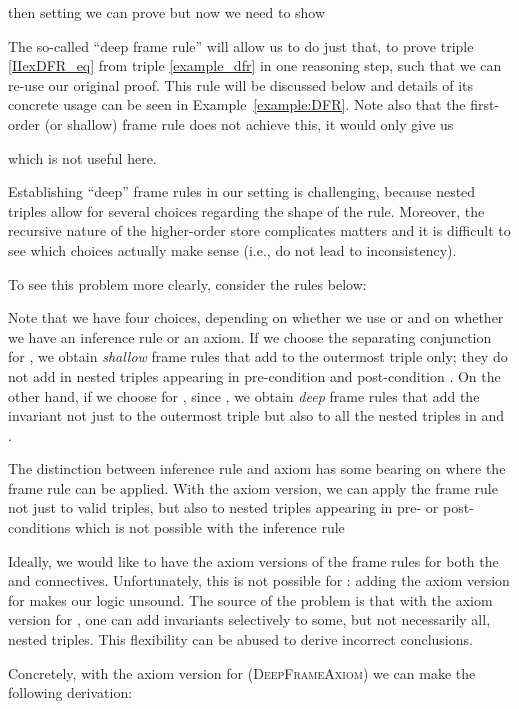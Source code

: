 \documentclass{LMCS}
\theoremstyle{remark}
\begin{document}
then setting  we can prove  but now we need to  show

The so-called ``deep frame rule'' will allow us to  do just that, to prove triple \eqref{IIexDFR_eq} from triple \eqref{example_dfr} in one reasoning step, such that we can re-use our original proof. This rule will be discussed below and details of its concrete usage can be seen in  Example~\ref{example:DFR}.
Note also that the first-order (or shallow) frame rule does not achieve this, it would only give us

which is   not useful here.



Establishing  ``deep'' frame rules in our setting is challenging, because nested triples allow for several choices regarding the shape of the rule.  Moreover, the recursive nature of the higher-order store complicates matters and it is difficult to see which choices actually make sense (i.e., do not lead to inconsistency).

To see this problem more clearly, consider
the rules below:

Note that we have four choices, depending on whether
we use  or  and on whether
we have an inference rule or an axiom. If we choose the separating conjunction  for ,
we obtain \emph{shallow} frame rules that  add  to 
the outermost triple  only; 
they do not add  in nested triples
appearing in pre-condition  and post-condition . On the other hand,
if we choose  for , since ,
we obtain \emph{deep} frame rules that add
the invariant  not just 
to the outermost triple but also to all the nested triples in  and . 

The distinction between inference rule and axiom has  
some bearing on where the frame rule can be applied. With
the axiom version, we can apply the frame rule not just to valid triples,
but also to nested triples appearing in pre- or post-conditions
which is not possible with the inference rule

Ideally, we would like to have the axiom versions of the frame rules
for both the  and  connectives. Unfortunately, this is not possible for : 
adding the axiom version for   makes our logic unsound.
The source of the problem is that with the axiom 
version for , one can add invariants selectively to some, but not necessarily all,
nested triples. This flexibility can be abused to derive 
incorrect conclusions. 

Concretely, with the axiom version for  (\textsc{DeepFrameAxiom}) we can make the following derivation:
\end{document}
